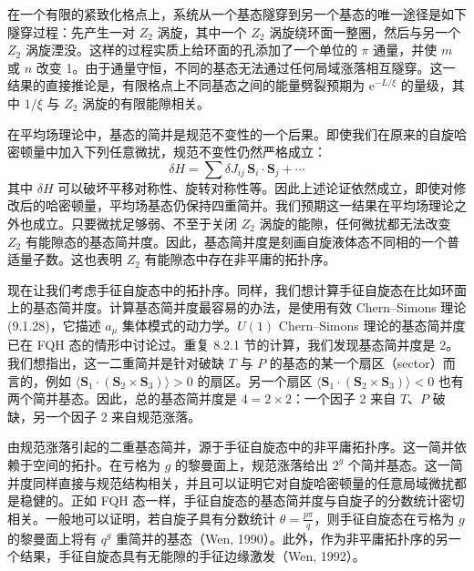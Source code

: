 
在一个有限的紧致化格点上，系统从一个基态隧穿到另一个基态的唯一途径是如下隧穿过程：先产生一对 $Z_2$ 涡旋，其中一个 $Z_2$ 涡旋绕环面一整圈，然后与另一个 $Z_2$ 涡旋湮没。这样的过程实质上给环面的孔添加了一个单位的 $\pi$ 通量，并使 $m$ 或 $n$ 改变 1。由于通量守恒，不同的基态无法通过任何局域涨落相互隧穿。这一结果的直接推论是，有限格点上不同基态之间的能量劈裂预期为 $\mathrm{e}^{-L/\xi}$ 的量级，其中 $1/\xi$ 与 $Z_2$ 涡旋的有限能隙相关。

在平均场理论中，基态的简并是规范不变性的一个后果。即使我们在原来的自旋哈密顿量中加入下列任意微扰，规范不变性仍然严格成立：
\begin{equation*}
\delta H=\sum\delta J_{ij}\,\pmb{S}_i\cdot\pmb{S}_j+\cdots
\tag{9.3.2}
\end{equation*}
其中 $\delta H$ 可以破坏平移对称性、旋转对称性等。因此上述论证依然成立，即使对修改后的哈密顿量，平均场基态仍保持四重简并。我们预期这一结果在平均场理论之外也成立。只要微扰足够弱、不至于关闭 $Z_2$ 涡旋的能隙，任何微扰都无法改变 $Z_2$ 有能隙态的基态简并度。因此，基态简并度是刻画自旋液体态不同相的一个普适量子数。这也表明 $Z_2$ 有能隙态中存在非平庸的拓扑序。

现在让我们考虑手征自旋态中的拓扑序。同样，我们想计算手征自旋态在比如环面上的基态简并度。计算基态简并度最容易的办法，是使用有效 Chern--Simons 理论 (9.1.28)，它描述 $a_{\mu}$ 集体模式的动力学。$U(1)$ Chern--Simons 理论的基态简并度已在 FQH 态的情形中讨论过。重复 8.2.1 节的计算，我们发现基态简并度是 2。我们想指出，这一二重简并是针对破缺 $T$ 与 $P$ 的基态的某一个扇区（sector）而言的，例如 $\langle\pmb{S}_1\cdot(\pmb{S}_2\times\pmb{S}_3)\rangle>0$ 的扇区。另一个扇区 $\langle\pmb{S}_1\cdot(\pmb{S}_2\times\pmb{S}_3)\rangle<0$ 也有两个简并基态。因此，总的基态简并度是 $4=2\times2$：一个因子 2 来自 $T$、$P$ 破缺，另一个因子 2 来自规范涨落。

由规范涨落引起的二重基态简并，源于手征自旋态中的非平庸拓扑序。这一简并依赖于空间的拓扑。在亏格为 $g$ 的黎曼面上，规范涨落给出 $2^g$ 个简并基态。这一简并度同样直接与规范结构相关，并且可以证明它对自旋哈密顿量的任意局域微扰都是稳健的。正如 FQH 态一样，手征自旋态的基态简并度与自旋子的分数统计密切相关。一般地可以证明，若自旋子具有分数统计 $\theta=\frac{p\pi}{q}$，则手征自旋态在亏格为 $g$ 的黎曼面上将有 $q^g$ 重简并的基态（Wen, 1990）。此外，作为非平庸拓扑序的另一个结果，手征自旋态具有无能隙的手征边缘激发（Wen, 1992）。

